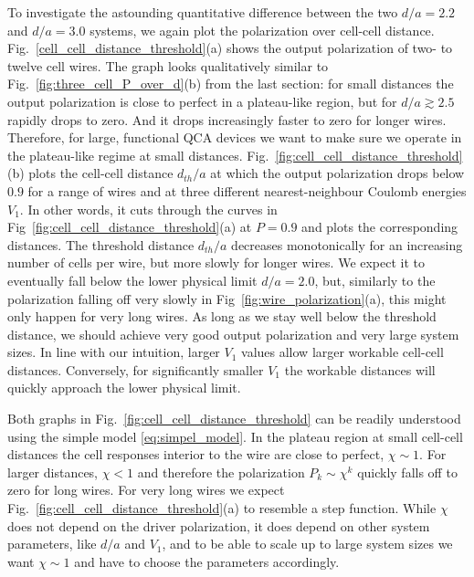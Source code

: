 To investigate the astounding quantitative difference between the two $d/a =
2.2$ and $d/a = 3.0$ systems, we again plot the polarization over cell-cell
distance. Fig.~\ref{cell_cell_distance_threshold}(a) shows the output
polarization of two- to twelve cell wires. The graph looks qualitatively similar
to Fig.~\ref{fig:three_cell_P_over_d}(b) from the last section: for small
distances the output polarization is close to perfect in a plateau-like region,
but for $d/a \gtrsim 2.5$ rapidly drops to zero. And it drops increasingly
faster to zero for longer wires. Therefore, for large, functional QCA devices we
want to make sure we operate in the plateau-like regime at small distances.
Fig.~\ref{fig:cell_cell_distance_threshold}(b) plots the cell-cell distance
$d_{th}/a$ at which the output polarization drops below $0.9$ for a range of
wires and at three different nearest-neighbour Coulomb energies $V_1$. In other
words, it cuts through the curves in
Fig~\ref{fig:cell_cell_distance_threshold}(a) at $P = 0.9$ and plots the
corresponding distances. The threshold distance $d_{th}/a$ decreases
monotonically for an increasing number of cells per wire, but more slowly for
longer wires. We expect it to eventually fall below the lower physical limit
$d/a = 2.0$, but, similarly to the polarization falling off very slowly in
Fig~\ref{fig:wire_polarization}(a), this might only happen for very long wires.
As long as we stay well below the threshold distance, we should achieve very
good output polarization and very large system sizes. In line with our
intuition, larger $V_1$ values allow larger workable cell-cell distances.
Conversely, for significantly smaller $V_1$ the workable distances will quickly
approach the lower physical limit.

Both graphs in Fig.~\ref{fig:cell_cell_distance_threshold} can be readily
understood using the simple model \eqref{eq:simpel_model}. In the plateau region
at small cell-cell distances the cell responses interior to the wire are close
to perfect, $\chi \sim 1$. For larger distances, $\chi < 1$ and therefore the
polarization $P_k \sim \chi^k$ quickly falls off to zero for long wires. For
very long wires we expect Fig.~\ref{fig:cell_cell_distance_threshold}(a) to
resemble a step function. While $\chi$ does not depend on the driver
polarization, it does depend on other system parameters, like $d/a$ and $V_1$,
and to be able to scale up to large system sizes we want $\chi \sim 1$ and have
to choose the parameters accordingly.

